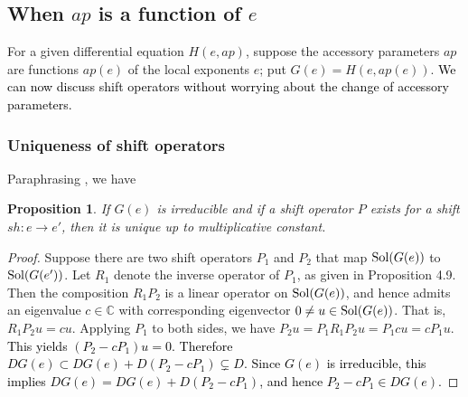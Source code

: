 \documentclass[a4paper,12pt]{article}
\newtheorem{prp}[thm]{Proposition}
\theoremstyle{definition}
\theoremstyle{remark}
\numberwithin{equation}{section} %
\newcommand{\blue}[1]{\textcolor{black}{#1}}
\newcommand{\red}[1]{\textcolor{black}{#1}}
\def\comment#1{ }
\begin{document}
\subsection{When $ap$ is a function of $e$}
For a given differential equation $H(e,ap)$, suppose the accessory parameters $ap$ are functions $ap(e)$ of the local exponents $e$; put $G(e)=H(e,ap(e))$. \blue{We can now discuss shift operators without worrying about the change of accessory parameters.}

\subsubsection{Uniqueness of shift operators}Paraphrasing \cite[Proposition 2.13]{vPS}, we have
\begin{prp}\label{uniquenessofshiftop} If $G(e)$ is irreducible and if a shift operator $P$ exists for a shift $sh:e\to e'$, then it is unique up to multiplicative constant. %
\end{prp}
\begin{proof}
 Suppose there are two shift operators $P_1$ and $P_2$
that map ${\rm Sol}(G(e))$ to ${\rm Sol}(G(e'))$.
Let $R_1$ denote the inverse operator of $P_1$, as given in Proposition 4.9.
Then the composition $R_1 P_2$ %
is a linear operator on ${\rm Sol}(G(e))$,
and hence admits an eigenvalue $c \in \mathbb{C}$ with corresponding eigenvector $0 \neq u \in {\rm Sol}(G(e))$.
That is, $R_1 P_2 u = c u$.
Applying $P_1$ to both sides, %
we have $P_2 u = P_1 R_1 P_2 u = P_1 c u = c P_1 u$.
\red{This yields $(P_2- c P_1) u=0$.
Therefore $D G(e) \subset D G(e) + D(P_2-c P_1) \subsetneq D$.
Since $G(e)$ is irreducible, this implies
$D G(e) = D G(e) + D(P_2-c P_1)$,
and hence $P_2 - c P_1 \in D G(e)$.}
\end{proof}
\comment{
\begin{proof} 
  Suppose there are two shift operators $P_1$ and $P_2$ sending ${\rm Sol}(G(e))$ to ${\rm Sol}(G(e')$. Let $R_2$ be the inverse operator of $P_2$ modulo $G(e)$. The operator $R_2P_1:{\rm Sol}(G(e))\to{\rm Sol}(G(e))$ is equivalent modulo $G(e)$ to an operator of order lower than the order of $G(e)$. Since it is not zero, by Schur's lemma, it is an isomorphism. Choosing an eigenvector $f$ with eigenvalue $c$, we have $R_2P_1f=cf$, that is, $(R_2P_1-c)f=0$. This implies $R_2P_1=c$, that is, $P_1=cP_2$.
  \end{proof}
}
\end{document}
